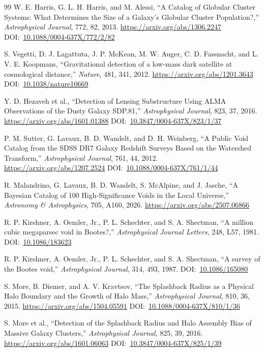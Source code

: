 \documentclass[10pt,onecolumn]{article}
\newcommand{\doi}[1]{DOI:~\href{https://doi.org/#1}{#1}}
\begin{document}
\begin{thebibliography}{99}
W. E. Harris, G. L. H. Harris, and M. Alessi,
``A Catalog of Globular Cluster Systems: What Determines the Size of a Galaxy's Globular Cluster Population?,''
\emph{Astrophysical Journal}, 772, 82, 2013.
\url{https://arxiv.org/abs/1306.2247}
\doi{10.1088/0004-637X/772/2/82}

S. Vegetti, D. J. Lagattuta, J. P. McKean, M. W. Auger, C. D. Fassnacht, and L. V. E. Koopmans,
``Gravitational detection of a low-mass dark satellite at cosmological distance,''
\emph{Nature}, 481, 341, 2012.
\url{https://arxiv.org/abs/1201.3643}
\doi{10.1038/nature10669}

Y. D. Hezaveh et al.,
``Detection of Lensing Substructure Using ALMA Observations of the Dusty Galaxy SDP.81,''
\emph{Astrophysical Journal}, 823, 37, 2016.
\url{https://arxiv.org/abs/1601.01388}
\doi{10.3847/0004-637X/823/1/37}

P. M. Sutter, G. Lavaux, B. D. Wandelt, and D. H. Weinberg,
``A Public Void Catalog from the SDSS DR7 Galaxy Redshift Surveys Based on the Watershed Transform,''
\emph{Astrophysical Journal}, 761, 44, 2012.
\url{https://arxiv.org/abs/1207.2524}
\doi{10.1088/0004-637X/761/1/44}

R. Malandrino, G. Lavaux, B. D. Wandelt, S. McAlpine, and J. Jasche,
``A Bayesian Catalog of 100 High-Significance Voids in the Local Universe,''
\emph{Astronomy \& Astrophysics}, 705, A160, 2026.
\url{https://arxiv.org/abs/2507.06866}

R. P. Kirshner, A. Oemler, Jr., P. L. Schechter, and S. A. Shectman,
``A million cubic megaparsec void in Bootes?,''
\emph{Astrophysical Journal Letters}, 248, L57, 1981.
\doi{10.1086/183623}

R. P. Kirshner, A. Oemler, Jr., P. L. Schechter, and S. A. Shectman,
``A survey of the Bootes void,''
\emph{Astrophysical Journal}, 314, 493, 1987.
\doi{10.1086/165080}

S. More, B. Diemer, and A. V. Kravtsov,
``The Splashback Radius as a Physical Halo Boundary and the Growth of Halo Mass,''
\emph{Astrophysical Journal}, 810, 36, 2015.
\url{https://arxiv.org/abs/1504.05591}
\doi{10.1088/0004-637X/810/1/36}

S. More et al.,
``Detection of the Splashback Radius and Halo Assembly Bias of Massive Galaxy Clusters,''
\emph{Astrophysical Journal}, 825, 39, 2016.
\url{https://arxiv.org/abs/1601.06063}
\doi{10.3847/0004-637X/825/1/39}


\end{thebibliography}
\end{document}
